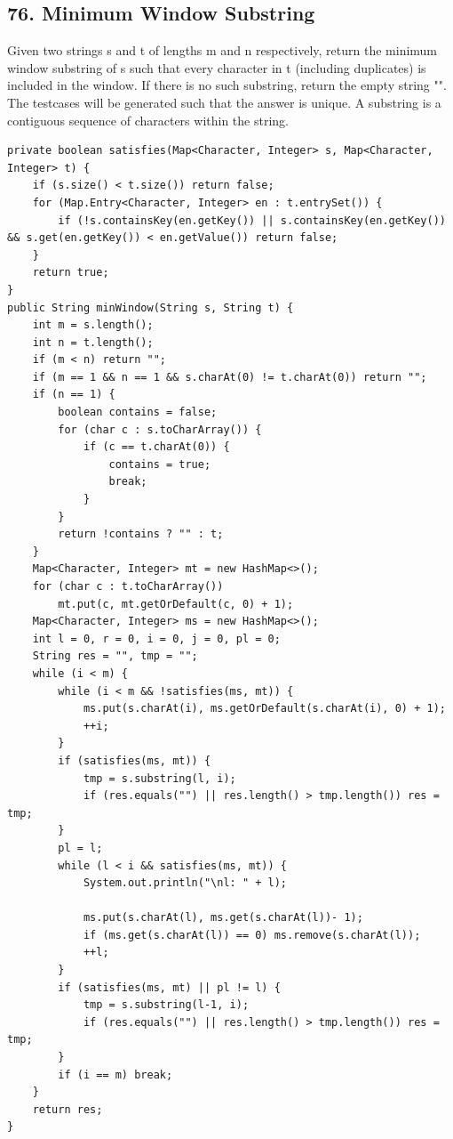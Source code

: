 \documentclass[9pt, b5paaper]{book}
\begin{document}
\subsection{76. Minimum Window Substring}
\label{sec-5-0-4}
Given two strings s and t of lengths m and n respectively, return the minimum window substring of s such that every character in t (including duplicates) is included in the window. If there is no such substring, return the empty string "".
The testcases will be generated such that the answer is unique.
A substring is a contiguous sequence of characters within the string.
\begin{verbatim}
private boolean satisfies(Map<Character, Integer> s, Map<Character, Integer> t) {
    if (s.size() < t.size()) return false;
    for (Map.Entry<Character, Integer> en : t.entrySet()) {
        if (!s.containsKey(en.getKey()) || s.containsKey(en.getKey()) && s.get(en.getKey()) < en.getValue()) return false;
    }
    return true;
}
public String minWindow(String s, String t) {
    int m = s.length();
    int n = t.length();
    if (m < n) return "";
    if (m == 1 && n == 1 && s.charAt(0) != t.charAt(0)) return "";
    if (n == 1) {
        boolean contains = false;
        for (char c : s.toCharArray()) {
            if (c == t.charAt(0)) {
                contains = true;
                break;
            }
        }
        return !contains ? "" : t;
    } 
    Map<Character, Integer> mt = new HashMap<>();
    for (char c : t.toCharArray()) 
        mt.put(c, mt.getOrDefault(c, 0) + 1);
    Map<Character, Integer> ms = new HashMap<>();
    int l = 0, r = 0, i = 0, j = 0, pl = 0;
    String res = "", tmp = "";
    while (i < m) {
        while (i < m && !satisfies(ms, mt)) {
            ms.put(s.charAt(i), ms.getOrDefault(s.charAt(i), 0) + 1);
            ++i;
        }
        if (satisfies(ms, mt)) {
            tmp = s.substring(l, i);
            if (res.equals("") || res.length() > tmp.length()) res = tmp;
        }
        pl = l;
        while (l < i && satisfies(ms, mt)) {
            System.out.println("\nl: " + l);

            ms.put(s.charAt(l), ms.get(s.charAt(l))- 1);
            if (ms.get(s.charAt(l)) == 0) ms.remove(s.charAt(l));
            ++l;
        }
        if (satisfies(ms, mt) || pl != l) {
            tmp = s.substring(l-1, i);
            if (res.equals("") || res.length() > tmp.length()) res = tmp;
        }
        if (i == m) break;
    }
    return res;
}
\end{verbatim}
\end{document}
